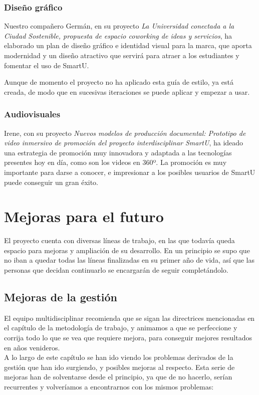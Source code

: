 \subsubsection{Diseño gráfico}
Nuestro compañero Germán, en su proyecto \textit{La Universidad conectada a la Ciudad Sostenible, propuesta de espacio coworking de ideas y servicios}, ha elaborado un plan de diseño gráfico e identidad visual para la marca, que aporta modernidad y un diseño atractivo que servirá para atraer a los estudiantes y fomentar el uso de SmartU.

Aunque de momento el proyecto no ha aplicado esta guía de estilo, ya está creada, de modo que en sucesivas iteraciones se puede aplicar y empezar a usar.

\subsubsection{Audiovisuales}
Irene, con su proyecto \textit{Nuevos modelos de producción documental: Prototipo de video inmersivo de promoción del proyecto interdisciplinar SmartU}, ha ideado una estrategia de promoción muy innovadora y adaptada a las tecnologías presentes hoy en día, como son los videos en 360º. La promoción es muy importante para darse a conocer, e impresionar a los posibles usuarios de SmartU puede conseguir un gran éxito.

\section{Mejoras para el futuro}
El proyecto cuenta con diversas líneas de trabajo, en las que todavía queda espacio para mejoras y ampliación de su desarrollo. En un principio se supo que no iban a quedar todas las líneas finalizadas en su primer año de vida, así que las personas que decidan continuarlo se encargarán de seguir completándolo.

\subsection{Mejoras de la gestión}
El equipo multidisciplinar recomienda que se sigan las directrices mencionadas en el capítulo de la metodología de trabajo, y animamos a que se perfeccione y corrija todo lo que se vea que requiere mejora, para conseguir mejores resultados en años venideros.\\

A lo largo de este capítulo se han ido viendo los problemas derivados de la gestión que han ido surgiendo, y posibles mejoras al respecto. Esta serie de mejoras han de solventarse desde el principio, ya que de no hacerlo, serían recurrentes y volveríamos a encontrarnos con los mismos problemas:


